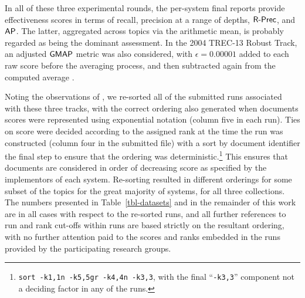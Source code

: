 In all of these three experimental rounds, the per-system final
reports provide effectiveness scores in terms of recall, precision at
a range of depths, ${\mbox{\sf{R-Prec}}}$, and ${\mbox{\sf{AP}}}$.
The latter, aggregated across topics via the arithmetic mean, is
probably regarded as being the dominant assessment.
In the 2004 TREC-13 Robust Track, an adjusted ${\mbox{\sf{GMAP}}}$ metric
{\citep{robertson06cikm}} was also considered, with
$\epsilon=0.00001$ added to each raw score before the averaging
process, and then subtracted again from the computed average
{\citep{voorhees04trecrobust}}.

\begin{table}[t]
\centering

\aftertabspace
\end{table}

Noting the observations of {\citet{ymt16airs}}, we re-sorted all of
the submitted runs associated with these three tracks, with the
correct ordering also generated when documents scores were represented
using exponential notation (column five in each run).
Ties on score were decided according to the assigned rank at the
time the run was constructed (column four in the submitted file) with
a sort by document identifier the final step to ensure that the
ordering was deterministic.{\footnote{{\tt{sort -k1,1n -k5,5gr -k4,4n
-k3,3}}, with the final ``{\tt{-k3,3}}'' component not a deciding
factor in any of the runs.}}
This ensures that documents are considered in order of decreasing
score as specified by the implementors of each system.
Re-sorting resulted in different orderings for some subset of the
topics for the great majority of systems, for all three collections.
The numbers presented in Table~\ref{tbl-datasets} and in the
remainder of this work are in all cases with respect to the re-sorted
runs, and all further references to run and rank cut-offs within runs
are based strictly on the resultant ordering, with no further
attention paid to the scores and ranks embedded in the runs provided
by the participating research groups.

